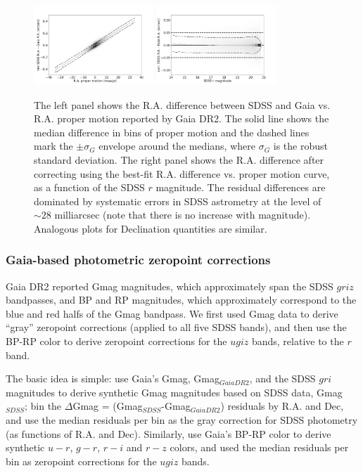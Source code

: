 \begin{figure}[th!]
\centering \includegraphics[width=0.4\textwidth, keepaspectratio]{figures/astroVSpm_RA_pm.png}
\centering \includegraphics[width=0.4\textwidth, keepaspectratio]{figures/astroVSpm_RA_r.png}

\caption{The left panel shows the R.A. difference between SDSS and Gaia 
vs. R.A. proper motion reported by Gaia DR2. The solid line shows the median difference in bins 
of proper motion and the dashed lines mark the $\pm \sigma_G$ envelope around the medians,
where $\sigma_G$ is the robust standard deviation. The right panel shows the R.A. difference 
after correcting using the best-fit R.A. difference vs. 
proper motion curve, as a function of the SDSS $r$ magnitude. The residual differences are dominated 
by systematic errors in SDSS astrometry at the level of $\sim28$ milliarcsec (note that there is no increase with 
magnitude). Analogous plots for Declination quantities are similar. 
\label{fig:GaiaRApm}}
\end{figure}
  

\subsubsection{Gaia-based photometric zeropoint corrections}

Gaia DR2 reported Gmag magnitudes, which approximately span the SDSS $griz$ bandpasses, 
and BP and RP magnitudes, which approximately correspond to the blue and red halfs of the 
Gmag bandpass. We first used Gmag data to derive ``gray'' zeropoint corrections (applied to
all five SDSS bands), and then use the BP-RP color to derive zeropoint corrections for the 
$ugiz$ bands, relative to the $r$ band. 

The basic idea is simple: use Gaia's Gmag, Gmag$_{GaiaDR2}$, and the SDSS $gri$ magnitudes
to derive synthetic Gmag magnitudes based on SDSS data, Gmag$_{SDSS}$; bin the 
$\Delta$Gmag = (Gmag$_{SDSS}$-Gmag$_{GaiaDR2}$) residuals by R.A. and Dec, and 
use the median residuals per bin as the gray correction for SDSS photometry (as functions
of R.A. and Dec). Similarly, use Gaia's BP-RP color to derive synthetic $u-r$, $g-r$, $r-i$
and $r-z$ colors, and used the median residuals per bin as zeropoint corrections for 
the $ugiz$ bands. 

